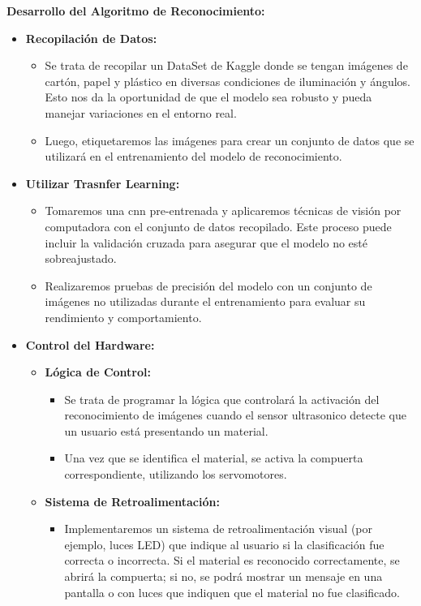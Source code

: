 \textbf{Desarrollo del Algoritmo de Reconocimiento:}
\begin{itemize}
    \item \textbf{Recopilación de Datos:}
    \begin{itemize}
        \item Se trata de recopilar un DataSet de Kaggle donde se tengan imágenes de cartón, papel y plástico en diversas condiciones de iluminación y ángulos. Esto nos da la oportunidad de que el modelo sea robusto y pueda manejar variaciones en el entorno real.
        \item Luego, etiquetaremos las imágenes para crear un conjunto de datos que se utilizará en el entrenamiento del modelo de reconocimiento.
    \end{itemize}
    
    \item \textbf{Utilizar Trasnfer Learning:}
    \begin{itemize}
        \item Tomaremos una cnn pre-entrenada y aplicaremos técnicas de visión por computadora con el conjunto de datos recopilado. Este proceso puede incluir la validación cruzada para asegurar que el modelo no esté sobreajustado.
        \item Realizaremos pruebas de precisión del modelo con un conjunto de imágenes no utilizadas durante el entrenamiento para evaluar su rendimiento y comportamiento.
    \end{itemize}
    
    \item \textbf{Control del Hardware:}
    \begin{itemize}
        \item \textbf{Lógica de Control:}
        \begin{itemize}
            \item Se trata de programar la lógica que controlará la activación del reconocimiento de imágenes cuando el sensor ultrasonico detecte que un usuario está presentando un material.
            \item Una vez que se identifica el material, se activa la compuerta correspondiente, utilizando los servomotores.
        \end{itemize}
        
        \item \textbf{Sistema de Retroalimentación:}
        \begin{itemize}
            \item Implementaremos un sistema de retroalimentación visual (por ejemplo, luces LED) que indique al usuario si la clasificación fue correcta o incorrecta. Si el material es reconocido correctamente, se abrirá la compuerta; si no, se podrá mostrar un mensaje en una pantalla o con luces que indiquen que el material no fue clasificado.
        \end{itemize}
    \end{itemize}
\end{itemize}

